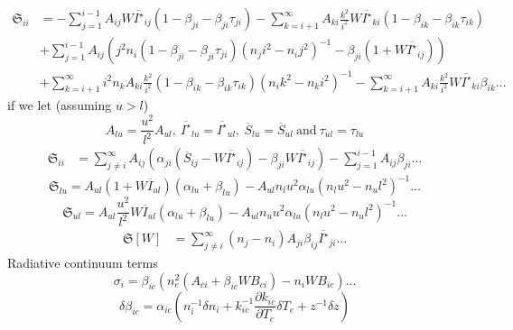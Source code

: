 \documentclass{article}
\begin{document}
\begin{equation}
    \begin{aligned}
        \mathfrak{S}_{ii} &= -\sum\limits_{j=1}^{i-1} A_{ij}W\overline{I^\star}_{ij}(1 - \beta_{ji} - \beta_{ji}\tau_{ji})-\sum\limits_{k=i+1}^\infty A_{ki}\frac{k^2}{i^2}W\overline{I^\star}_{ki}(1 - \beta_{ik} - \beta_{ik}\tau_{ik})\\
        &+\sum\limits_{j=1}^{i-1} A_{ij}\left(j^2n_i (1 - \beta_{ji} - \beta_{ji}\tau_{ji})(n_ji^2 - n_ij^2)^{-1} -\beta_{ji}(1+W\overline{I^\star}_{ij})\right)\\
        &+\sum\limits_{k=i+1}^\infty i^2n_kA_{ki}\frac{k^2}{i^2}(1 - \beta_{ik} - \beta_{ik}\tau_{ik})(n_ik^2 - n_ki^2)^{-1}-\sum\limits_{k=i+1}^\infty A_{ki}\frac{k^2}{i^2}W\overline{I^\star}_{ki}\beta_{ik}\dots
    \end{aligned}
\end{equation}
if we let (assuming \(u > l\))
\[
    A_{lu} = \frac{u^2}{l^2}A_{ul},\ \overline{I^\star}_{lu} = \overline{I^\star}_{ul},\ \overline{S}_{lu} = \overline{S}_{ul} \ \mathrm{and}\ \tau_{ul} = \tau_{lu}
\]
\begin{equation}
    \begin{aligned}
        \mathfrak{S}_{ii} &= \sum\limits_{j \neq i}^{\infty} A_{ij}\left(\alpha_{ji}(\overline{S}_{ij} - W\overline{I^\star}_{ij}) -\beta_{ji}W\overline{I^\star}_{ij}\right) - \sum\limits_{j=1}^{i-1}A_{ij}\beta_{ji}\dots
    \end{aligned}
\end{equation}
\begin{equation}
    \mathfrak{S}_{lu} = A_{ul}(1 + W\overline{I}_{ul})(\alpha_{lu} + \beta_{lu}) - A_{ul}n_lu^2\alpha_{lu}(n_lu^2 - n_ul^2)^{-1}\dots
\end{equation}
\begin{equation}
    \mathfrak{S}_{ul} = A_{ul}\frac{u^2}{l^2}W\overline{I}_{ul}(\alpha_{lu}  + \beta_{lu}) - A_{ul}n_uu^2\alpha_{lu}(n_lu^2 - n_ul^2)^{-1}\dots
\end{equation}
\begin{equation}
    \begin{aligned}
        \mathfrak{S}[W] &= \sum\limits_{j\neq i}^\infty (n_j-n_i)A_{ji}\beta_{ij}\overline{I^\star}_{ji} \ldots
    \end{aligned}\end{equation}
Radiative continuum terms
\[
    \sigma_i = \beta_{ic}(n_e^2(A_{ci} + \beta_{ic}WB_{ci}) - n_iWB_{ic})...
\]
\[
    \delta \beta_{ic} = \alpha_{ic}\left(n_i^{-1}\delta n_i + k_{ic}^{-1}\frac{\partial k_{ic}}{\partial T_e}\delta T_e + z^{-1}\delta z\right)
\]
\end{document}

